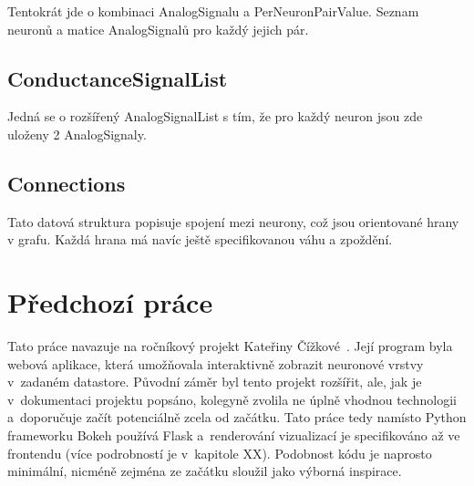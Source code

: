 Tentokrát jde o kombinaci AnalogSignalu a PerNeuronPairValue. Seznam neuronů a matice AnalogSignalů pro každý jejich pár.

\subsection{ConductanceSignalList}

Jedná se o rozšířený AnalogSignalList s tím, že pro každý neuron jsou zde uloženy 2 AnalogSignaly.

\subsection{Connections}

Tato datová struktura popisuje spojení mezi neurony, což jsou orientované hrany v grafu. Každá hrana má navíc ještě specifikovanou váhu a zpoždění.

\section{Předchozí práce}

Tato práce navazuje na ročníkový projekt Kateřiny Čížkové~\cite{Cizkova2020nprg035}. Její program byla webová aplikace, která umožňovala interaktivně zobrazit neuronové vrstvy v~zadaném datastore. Původní záměr byl tento projekt rozšířit, ale, jak je v~dokumentaci projektu popsáno, kolegyně zvolila ne úplně vhodnou technologii a~doporučuje začít potenciálně zcela od začátku. Tato práce tedy namísto Python frameworku Bokeh používá Flask a~renderování vizualizací je specifikováno až ve frontendu (více podrobností je v~kapitole XX). Podobnost kódu je naprosto minimální, nicméně zejména ze začátku sloužil jako výborná inspirace.